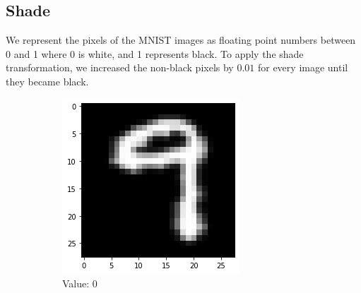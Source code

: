 \subsection{Shade}
We represent the pixels of the MNIST images as floating point numbers between 0 and 1 where 0 is white, and 1 represents black. To apply the shade transformation, we increased the non-black pixels by $0.01$ for every image until they became black.
    \begin{figure}[htb!]
        \centering
        \begin{subfigure}[b]{.3\textwidth}
            \centering
            \includegraphics[width=\linewidth]{images/shade1.png}
            \caption{Value: 0}
            \label{fig:Rotate-misclass0}
        \end{subfigure}%
        \begin{subfigure}[b]{.3\textwidth}
            \centering

\end{subfigure}
\end{figure}
